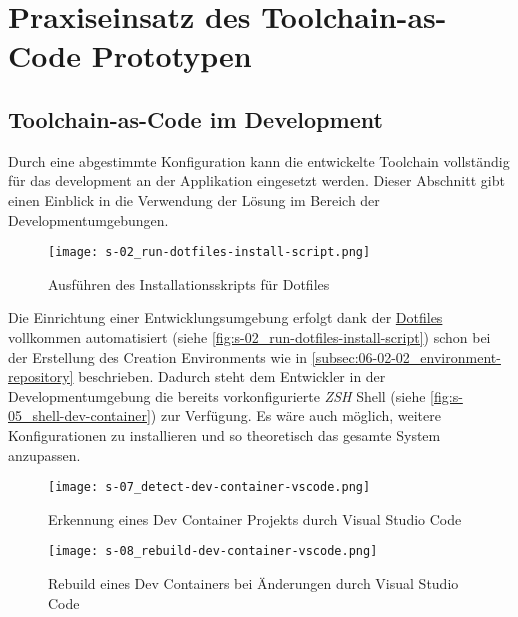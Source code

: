 \section{Praxiseinsatz des Toolchain-as-Code Prototypen}
\label{sec:06-03_practical-use-of-the-toolchain-as-code-prototype}

\subsection{Toolchain-as-Code im Development}
\label{subsec:06-03-01_toolchain-as-code-in-development}

Durch eine abgestimmte Konfiguration kann die entwickelte Toolchain vollständig für das \Gls{development} an der Applikation eingesetzt werden. Dieser Abschnitt gibt einen Einblick in die Verwendung der  Lösung im Bereich der Developmentumgebungen.

\begin{wrapfigure}{l}{0.7\textwidth}
    \vspace{-10pt}
    \centering
    \texttt{[image: s-02\_run-dotfiles-install-script.png]}
    \caption{Ausführen des Installationsskripts für Dotfiles}
    \label{fig:s-02_run-dotfiles-install-script}
    \vspace{-05pt}
\end{wrapfigure}

Die Einrichtung einer Entwicklungsumgebung erfolgt dank der \hyperref[sec:03-04_dotfiles]{Dotfiles} vollkommen automatisiert (siehe \autoref{fig:s-02_run-dotfiles-install-script}) schon bei der Erstellung des Creation Environments wie in \autoref{subsec:06-02-02_environment-repository} beschrieben. Dadurch steht dem Entwickler in der Developmentumgebung die bereits vorkonfigurierte \textit{ZSH} Shell (siehe \autoref{fig:s-05_shell-dev-container}) zur Verfügung. Es wäre auch möglich, weitere Konfigurationen zu installieren und so theoretisch das gesamte System anzupassen.

\begin{figure}[h]
    \centering
    \begin{minipage}[b]{0.49\textwidth}
        \centering
        \texttt{[image: s-07\_detect-dev-container-vscode.png]}
        \caption{Erkennung eines Dev Container Projekts durch Visual Studio Code}
        \label{fig:s-07_detect-dev-container-vscode}
    \end{minipage}
    \hfill
    \begin{minipage}[b]{0.49\textwidth}
        \centering
        \texttt{[image: s-08\_rebuild-dev-container-vscode.png]}
        \caption{Rebuild eines Dev Containers bei Änderungen durch Visual Studio Code}
        \label{fig:s-08_rebuild-dev-container-vscode}
    \end{minipage}
\end{figure}

